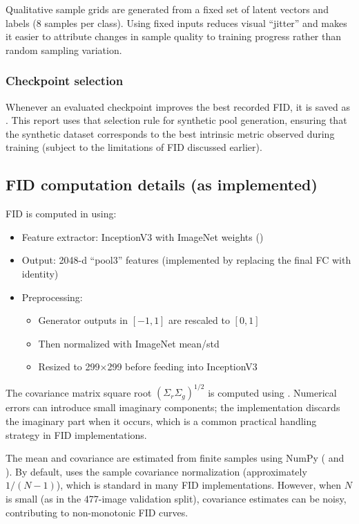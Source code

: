 Qualitative sample grids are generated from a fixed set of latent vectors and labels (8 samples per class). Using fixed inputs reduces visual ``jitter'' and makes it easier to attribute changes in sample quality to training progress rather than random sampling variation.

\subsubsection{Checkpoint selection}

Whenever an evaluated checkpoint improves the best recorded FID, it is saved as . This report uses that selection rule for synthetic pool generation, ensuring that the synthetic dataset corresponds to the best intrinsic metric observed during training (subject to the limitations of FID discussed earlier).

\subsection{FID computation details (as implemented)}

FID is computed in  using:
\begin{itemize}
\item Feature extractor: InceptionV3 with ImageNet weights ()
\item Output: 2048-d ``pool3'' features (implemented by replacing the final FC with identity)
\item Preprocessing:
\begin{itemize}
\item Generator outputs in \([-1,1]\) are rescaled to \([0,1]\)
\item Then normalized with ImageNet mean/std
\item Resized to 299×299 before feeding into InceptionV3
\end{itemize}
\end{itemize}

The covariance matrix square root \((\Sigma_r \Sigma_g)^{1/2}\) is computed using . Numerical errors can introduce small imaginary components; the implementation discards the imaginary part when it occurs, which is a common practical handling strategy in FID implementations.

The mean and covariance are estimated from finite samples using NumPy ( and ). By default,  uses the sample covariance normalization (approximately \(1/(N-1)\)), which is standard in many FID implementations. However, when \(N\) is small (as in the 477-image validation split), covariance estimates can be noisy, contributing to non-monotonic FID curves.

